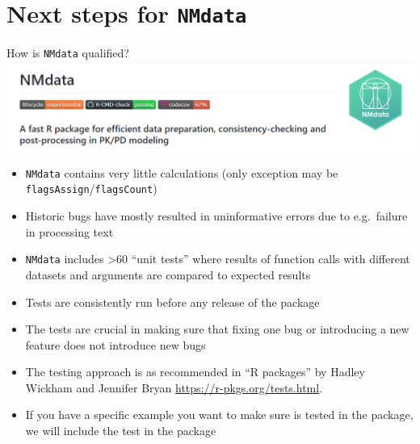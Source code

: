 \documentclass[
  8pt,
  ignorenonframetext,
  aspectratio=169]{beamer}
\begin{document}
\hypertarget{next-steps-for-nmdata}{%
\section{\texorpdfstring{Next steps for
\texttt{NMdata}}{Next steps for NMdata}}\label{next-steps-for-nmdata}}

\begin{frame}[fragile]{How is \texttt{NMdata} qualified?}
\protect\hypertarget{how-is-nmdata-qualified}{}
\includegraphics[width=.8\textwidth]{badges_snip}

\begin{itemize}
\item
  \texttt{NMdata} contains very little calculations (only exception may
  be \texttt{flagsAssign}/\texttt{flagsCount})
\item
  Historic bugs have mostly resulted in uninformative errors due to
  e.g.~failure in processing text
\item
  \texttt{NMdata} includes \textgreater60 ``unit tests'' where results
  of function calls with different datasets and arguments are compared
  to expected results
\item
  Tests are consistently run before any release of the package
\item
  The tests are crucial in making sure that fixing one bug or
  introducing a new feature does not introduce new bugs
\item
  The testing approach is as recommended in ``R packages'' by Hadley
  Wickham and Jennifer Bryan \url{https://r-pkgs.org/tests.html}.
\item
  If you have a specific example you want to make sure is tested in the
  package, we will include the test in the package
\end{itemize}
\end{frame}
\end{document}
